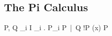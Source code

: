 \subsection{The Pi Calculus}

\begin{grammar}
P, Q
\grm \Sigma_{i \in I} \pi_i . P_i
\alt P\ |\ Q
\alt !P
\alt (\nu x) P
\end{grammar}

